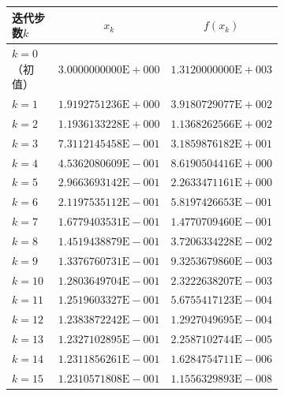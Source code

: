 \documentclass[11pt]{article}
\begin{document}
\begin{figure}
    \centering
    \begin{subfigure}[t]{\textwidth}
        \centering
        \begin{tabular}{|l|c|c|}
            \hline
            迭代步数$k$            & $x_k$                        & $f(x_k)$                     \\
            \hline $k = 0$（初值） & $3.0000000000\text{E}{+}000$ & $1.3120000000\text{E}{+}003$ \\
            \hline $k = 1$         & $1.9192751236\text{E}{+}000$ & $3.9180729077\text{E}{+}002$ \\
            \hline $k = 2$         & $1.1936133228\text{E}{+}000$ & $1.1368262566\text{E}{+}002$ \\
            \hline $k = 3$         & $7.3112145458\text{E}{-}001$ & $3.1859876182\text{E}{+}001$ \\
            \hline $k = 4$         & $4.5362080609\text{E}{-}001$ & $8.6190504416\text{E}{+}000$ \\
            \hline $k = 5$         & $2.9663693142\text{E}{-}001$ & $2.2633471161\text{E}{+}000$ \\
            \hline $k = 6$         & $2.1197535112\text{E}{-}001$ & $5.8197426653\text{E}{-}001$ \\
            \hline $k = 7$         & $1.6779403531\text{E}{-}001$ & $1.4770709460\text{E}{-}001$ \\
            \hline $k = 8$         & $1.4519438879\text{E}{-}001$ & $3.7206334228\text{E}{-}002$ \\
            \hline $k = 9$         & $1.3376760731\text{E}{-}001$ & $9.3253679860\text{E}{-}003$ \\
            \hline $k = 10$        & $1.2803649704\text{E}{-}001$ & $2.3222638207\text{E}{-}003$ \\
            \hline $k = 11$        & $1.2519603327\text{E}{-}001$ & $5.6755417123\text{E}{-}004$ \\
            \hline $k = 12$        & $1.2383872242\text{E}{-}001$ & $1.2927049695\text{E}{-}004$ \\
            \hline $k = 13$        & $1.2327102895\text{E}{-}001$ & $2.2587102744\text{E}{-}005$ \\
            \hline $k = 14$        & $1.2311856261\text{E}{-}001$ & $1.6284754711\text{E}{-}006$ \\
            \hline $k = 15$        & $1.2310571808\text{E}{-}001$ & $1.1556329893\text{E}{-}008$ \\

\end{tabular}
\end{subfigure}
\end{figure}
\end{document}
